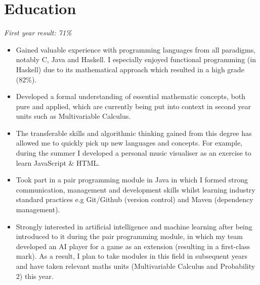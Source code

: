 \documentclass{cvclass}
\begin{document}
\titlespacing*{\subsection}{0pt}{\baselineskip}{1pt}
\address{Flat 7, 5-6 Clifton Down Road, Bristol, BS8 4AG}
\address{Email: sv17490@bristol.ac.uk, Mobile: 07908911995}
\address{Github: www.github.com/sollyvarcoe}
\section{Education}
\newline
\indent\indent\textit{First year result: 71\%}
\begin{itemize}
  \item Gained valuable experience with programming languages from all paradigms, notably C, Java and Haskell. I especially enjoyed functional programming (in Haskell) due to its mathematical approach which resulted in a high grade (82\%).
  \item Developed a formal understanding of essential mathematic concepts, both pure and applied, which are currently being put into context in second year units such as Multivariable Calculus.
  \item The transferable skills and algorithmic thinking gained from this degree has allowed me to quickly pick up new languages and concepts. For example, during the summer I developed a personal music visualiser as an exercise to learn JavaScript \& HTML.
  \item Took part in a pair programming module in Java in which I formed strong communication, management and development skills whilst learning industry standard practices e.g Git/Github (version control) and Maven (dependency management).
  \item Strongly interested in artificial intelligence and machine learning after being introduced to it during the pair programming module, in which my team developed an AI player for a game as an extension (resulting in a first-class mark). As a result, I plan to take modules in this field in subsequent years and have taken relevant maths units (Multivariable Calculus and Probability 2) this year.

\end{itemize}
\newline
{}\newline
{}\newline
\end{document}
